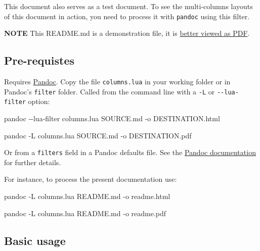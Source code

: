 \documentclass[
]{article}
\newenvironment{Shaded}{}{}
\newcommand{\AttributeTok}[1]{\textcolor[rgb]{0.49,0.56,0.16}{#1}}
\newcommand{\ExtensionTok}[1]{#1}
\newcommand{\NormalTok}[1]{#1}
\begin{document}
This document also serves as a test document. To see the multi-columns
layouts of this document in action, you need to process it with
\texttt{pandoc} using this filter.

\textbf{NOTE} This README.md is a demonstration file, it is
\href{https://github.com/dialoa/columns/blob/master/test.pdf}{better
viewed as PDF}.

\hypertarget{pre-requistes}{%
\subsection{Pre-requistes}\label{pre-requistes}}

Requires \href{https://pandoc.org/}{Pandoc}. Copy the file
\texttt{columns.lua} in your working folder or in Pandoc's
\texttt{filter} folder. Called from the command line with a \texttt{-L}
or \texttt{-\/-lua-filter} option:

\begin{Shaded}
\begin{Highlighting}[]
\ExtensionTok{pandoc} \AttributeTok{{-}{-}lua{-}filter}\NormalTok{ columns.lua SOURCE.md }\AttributeTok{{-}o}\NormalTok{ DESTINATION.html}

\ExtensionTok{pandoc} \AttributeTok{{-}L}\NormalTok{ columns.lua SOURCE.md }\AttributeTok{{-}o}\NormalTok{ DESTINATION.pdf}
\end{Highlighting}
\end{Shaded}

Or from a \texttt{filters} field in a Pandoc defaults file. See the
\href{https://pandoc.org/MANUAL.html}{Pandoc documentation} for further
details.

For instance, to process the present documentation use:

\begin{Shaded}
\begin{Highlighting}[]
\ExtensionTok{pandoc} \AttributeTok{{-}L}\NormalTok{ columns.lua README.md }\AttributeTok{{-}o}\NormalTok{ readme.html}

\ExtensionTok{pandoc} \AttributeTok{{-}L}\NormalTok{ columns.lua README.md }\AttributeTok{{-}o}\NormalTok{ readme.pdf}
\end{Highlighting}
\end{Shaded}

\hypertarget{basic-usage}{%
\subsection{Basic usage}\label{basic-usage}}
\end{document}
